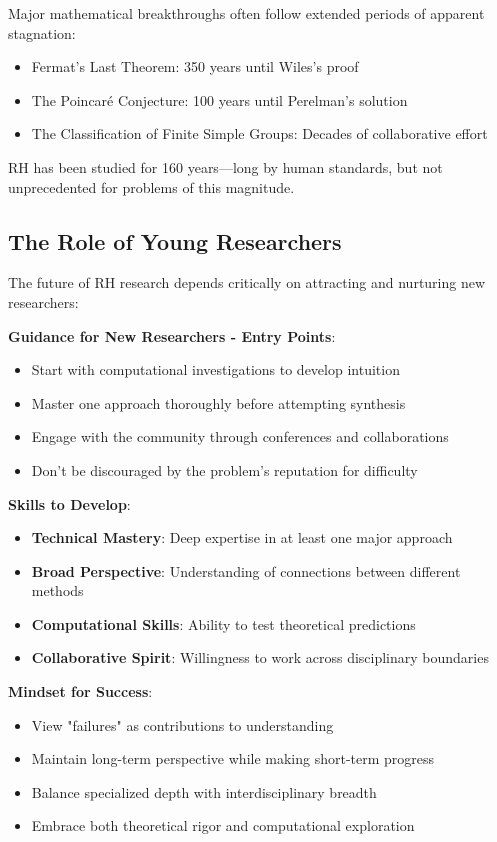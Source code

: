 \begin{insight}
Major mathematical breakthroughs often follow extended periods of apparent stagnation:
\begin{itemize}
\item Fermat's Last Theorem: 350 years until Wiles's proof
\item The Poincaré Conjecture: 100 years until Perelman's solution  
\item The Classification of Finite Simple Groups: Decades of collaborative effort
\end{itemize}
RH has been studied for 160 years—long by human standards, but not unprecedented for problems of this magnitude.
\end{insight}

\subsection{The Role of Young Researchers}
\label{subsec:young_researchers}

The future of RH research depends critically on attracting and nurturing new researchers:

\noindent\textbf{Guidance for New Researchers - Entry Points}:
\begin{itemize}
\item Start with computational investigations to develop intuition
\item Master one approach thoroughly before attempting synthesis
\item Engage with the community through conferences and collaborations
\item Don't be discouraged by the problem's reputation for difficulty
\end{itemize}

\textbf{Skills to Develop}:
\begin{itemize}
\item \textbf{Technical Mastery}: Deep expertise in at least one major approach
\item \textbf{Broad Perspective}: Understanding of connections between different methods
\item \textbf{Computational Skills}: Ability to test theoretical predictions
\item \textbf{Collaborative Spirit}: Willingness to work across disciplinary boundaries
\end{itemize}

\textbf{Mindset for Success}:
\begin{itemize}
\item View "failures" as contributions to understanding
\item Maintain long-term perspective while making short-term progress
\item Balance specialized depth with interdisciplinary breadth
\item Embrace both theoretical rigor and computational exploration
\end{itemize}

